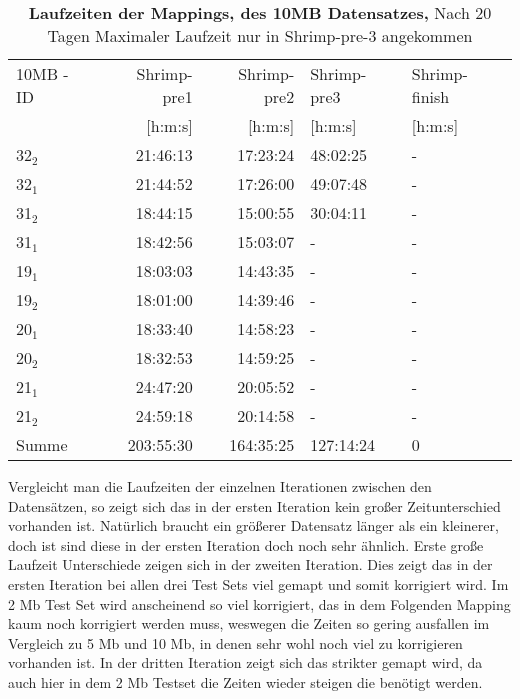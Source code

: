 \documentclass{scrartcl}
\begin{document}
\begin{table}[!h]
\caption[Laufzeiten der Mappings, des 10MB Datensatzes]{\textbf{Laufzeiten der Mappings, des 10MB Datensatzes,} Nach 20 Tagen Maximaler Laufzeit nur in Shrimp-pre-3 angekommen}
\begin{center}
\begin{tabular}{lrrll}
10MB - ID & Shrimp-pre1 & Shrimp-pre2 & Shrimp-pre3 & Shrimp-finish\\
 & [h:m:s] & [h:m:s] & [h:m:s] & [h:m:s]\\
\hline
32$_{\text{2}}$ & 21:46:13 & 17:23:24 & 48:02:25 & -\\
32$_{\text{1}}$ & 21:44:52 & 17:26:00 & 49:07:48 & -\\
31$_{\text{2}}$ & 18:44:15 & 15:00:55 & 30:04:11 & -\\
31$_{\text{1}}$ & 18:42:56 & 15:03:07 & - & -\\
19$_{\text{1}}$ & 18:03:03 & 14:43:35 & - & -\\
19$_{\text{2}}$ & 18:01:00 & 14:39:46 & - & -\\
20$_{\text{1}}$ & 18:33:40 & 14:58:23 & - & -\\
20$_{\text{2}}$ & 18:32:53 & 14:59:25 & - & -\\
21$_{\text{1}}$ & 24:47:20 & 20:05:52 & - & -\\
21$_{\text{2}}$ & 24:59:18 & 20:14:58 & - & -\\
Summe & 203:55:30 & 164:35:25 & 127:14:24 & 0\\
\end{tabular}
\end{center}
\end{table}
Vergleicht man die Laufzeiten der einzelnen Iterationen zwischen den Datensätzen, so zeigt sich das in der ersten Iteration kein großer Zeitunterschied vorhanden ist. 
Natürlich braucht ein größerer Datensatz länger als ein kleinerer, doch ist sind diese in der ersten Iteration doch noch sehr ähnlich. Erste große Laufzeit Unterschiede zeigen 
sich in der zweiten Iteration. Dies zeigt das in der ersten Iteration bei allen drei Test Sets viel gemapt und somit korrigiert wird. Im 2 Mb Test Set wird anscheinend so viel
korrigiert, das in dem Folgenden Mapping kaum noch korrigiert werden muss, weswegen die Zeiten so gering ausfallen im Vergleich zu 5 Mb und 10 Mb, in denen sehr wohl noch viel zu
korrigieren vorhanden ist. In der dritten Iteration zeigt sich das strikter gemapt wird, da auch hier in dem 2 Mb Testset die Zeiten wieder steigen die benötigt werden. 
\end{document}
